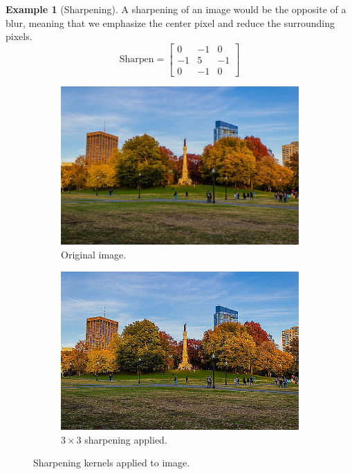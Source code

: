 \documentclass{article}
\theoremstyle{definition}
\newtheorem{example}{Example}[section]
\theoremstyle{remark}
\theoremstyle{definition}
\begin{document}
\begin{example}[Sharpening]
A sharpening of an image would be the opposite of a blur, meaning that we emphasize the center pixel and reduce the surrounding pixels. 
\[\text{Sharpen} = \begin{bmatrix} 0 & -1 & 0 \\ -1 & 5 & -1 \\ 0 & -1 & 0 \end{bmatrix}\]
\begin{figure}[hbt!]
    \centering
    \begin{subfigure}[b]{0.45\textwidth}
    \centering
        \includegraphics[width=\textwidth]{Images/OpenCV/Park_Full.png}
        \caption{Original image. }
        \label{fig:d}
    \end{subfigure}
    \begin{subfigure}[b]{0.45\textwidth}
    \centering
        \includegraphics[width=\textwidth]{Images/OpenCV/Sharpen.png}
        \caption{$3 \times 3$ sharpening applied. }
        \label{fig:d}
    \end{subfigure}

    \label{fig:cats_histogram}
    \caption{Sharpening kernels applied to image. }
\end{figure}
\end{example}
\end{document}

